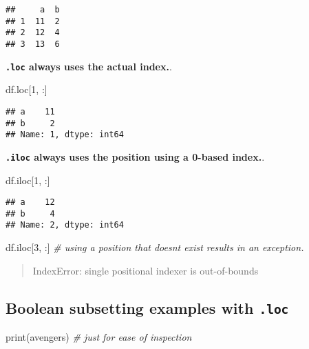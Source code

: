 \documentclass[
]{book}
\newenvironment{Shaded}{\begin{snugshade}}{\end{snugshade}}
\newcommand{\BuiltInTok}[1]{#1}
\newcommand{\CommentTok}[1]{\textcolor[rgb]{0.56,0.35,0.01}{\textit{#1}}}
\newcommand{\DecValTok}[1]{\textcolor[rgb]{0.00,0.00,0.81}{#1}}
\newcommand{\NormalTok}[1]{#1}
\begin{document}
\begin{verbatim}
##     a  b
## 1  11  2
## 2  12  4
## 3  13  6
\end{verbatim}

{\textbf{\texttt{.loc} always uses the actual index.}}.

\begin{Shaded}
\begin{Highlighting}[]
\NormalTok{df.loc[}\DecValTok{1}\NormalTok{, :] }
\end{Highlighting}
\end{Shaded}

\begin{verbatim}
## a    11
## b     2
## Name: 1, dtype: int64
\end{verbatim}

{\textbf{\texttt{.iloc} always uses the position using a 0-based index.}}.

\begin{Shaded}
\begin{Highlighting}[]
\NormalTok{df.iloc[}\DecValTok{1}\NormalTok{, :]}
\end{Highlighting}
\end{Shaded}

\begin{verbatim}
## a    12
## b     4
## Name: 2, dtype: int64
\end{verbatim}

\begin{Shaded}
\begin{Highlighting}[]
\NormalTok{df.iloc[}\DecValTok{3}\NormalTok{, :] }\CommentTok{\# using a position that doesn\textquotesingle{}t exist results in an exception. }
\end{Highlighting}
\end{Shaded}

\begin{quote}
IndexError: single positional indexer is out-of-bounds
\end{quote}

\hypertarget{boolean-subsetting-examples-with-.loc}{%
\subsection{\texorpdfstring{Boolean subsetting examples with \texttt{.loc}}{Boolean subsetting examples with .loc}}\label{boolean-subsetting-examples-with-.loc}}

\begin{Shaded}
\begin{Highlighting}[]
\BuiltInTok{print}\NormalTok{(avengers) }\CommentTok{\# just for ease of inspection}
\end{Highlighting}
\end{Shaded}
\end{document}
